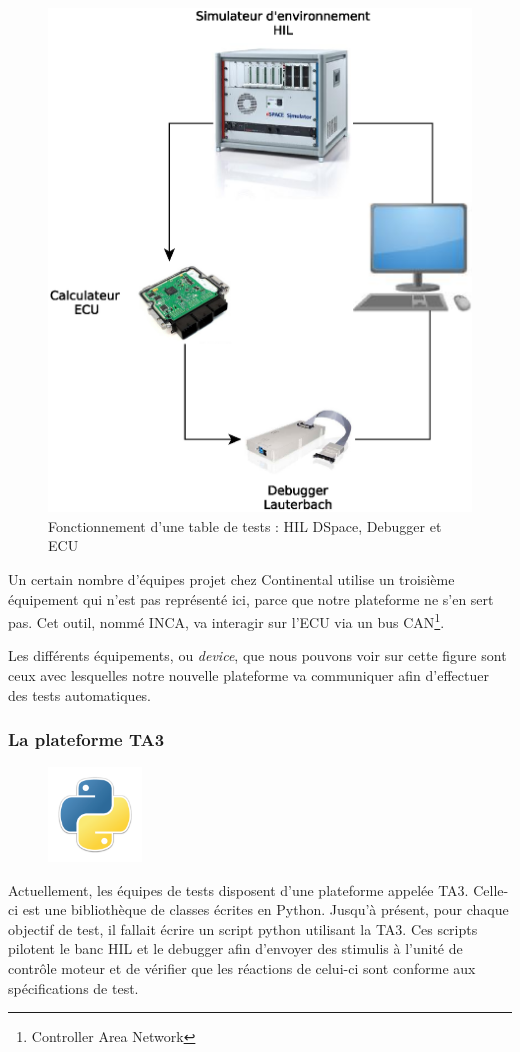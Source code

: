 		\begin{figure}[H]
			\centering
			\includegraphics[width=12.1cm]{contents/images/WB.eps}
			\caption{Fonctionnement d'une table de tests : HIL DSpace, Debugger et ECU}
			\label{fig:wb}
		\end{figure}
				\begin{remarque}
					Un certain nombre d'équipes projet chez Continental utilise un troisième équipement qui n'est pas représenté ici, parce que notre plateforme ne s'en sert pas. Cet outil, nommé INCA, va interagir sur l'ECU via un bus CAN\footnote{Controller Area Network}.
				\end{remarque}
		Les différents équipements, ou \textit{device}, que nous pouvons voir sur cette figure sont ceux avec lesquelles notre nouvelle plateforme va communiquer afin d'effectuer des tests automatiques. 
		
			\subsubsection{La plateforme TA3}\label{ta3}
			\begin{figure}
				\includegraphics[width=2.5cm]{contents/images/python.png}
			\end{figure}
			Actuellement, les équipes de tests disposent d'une plateforme appelée TA3. Celle-ci est une bibliothèque de classes écrites en Python. Jusqu'à présent, pour chaque objectif de test, il fallait écrire un script python utilisant la TA3. Ces scripts pilotent le banc HIL et le debugger afin d'envoyer des stimulis à l'unité de contrôle moteur et de vérifier que les réactions de celui-ci sont conforme aux spécifications de test.
			
